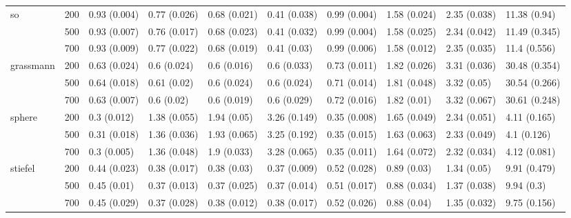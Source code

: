 \begin{tabular}{llllllllll}
\cline{1-10}
\multirow[t]{3}{*}{so} & 200 & 0.93 (0.004) & 0.77 (0.026) & 0.68 (0.021) & 0.41 (0.038) & 0.99 (0.004) & 1.58 (0.024) & 2.35 (0.038) & 11.38 (0.94) \\
 & 500 & 0.93 (0.007) & 0.76 (0.017) & 0.68 (0.023) & 0.41 (0.032) & 0.99 (0.004) & 1.58 (0.025) & 2.34 (0.042) & 11.49 (0.345) \\
 & 700 & 0.93 (0.009) & 0.77 (0.022) & 0.68 (0.019) & 0.41 (0.03) & 0.99 (0.006) & 1.58 (0.012) & 2.35 (0.035) & 11.4 (0.556) \\
\cline{1-10}
\multirow[t]{3}{*}{grassmann} & 200 & 0.63 (0.024) & 0.6 (0.024) & 0.6 (0.016) & 0.6 (0.033) & 0.73 (0.011) & 1.82 (0.026) & 3.31 (0.036) & 30.48 (0.354) \\
 & 500 & 0.64 (0.018) & 0.61 (0.02) & 0.6 (0.024) & 0.6 (0.024) & 0.71 (0.014) & 1.81 (0.048) & 3.32 (0.05) & 30.54 (0.266) \\
 & 700 & 0.63 (0.007) & 0.6 (0.02) & 0.6 (0.019) & 0.6 (0.029) & 0.72 (0.016) & 1.82 (0.01) & 3.32 (0.067) & 30.61 (0.248) \\
\cline{1-10}
\multirow[t]{3}{*}{sphere} & 200 & 0.3 (0.012) & 1.38 (0.055) & 1.94 (0.05) & 3.26 (0.149) & 0.35 (0.008) & 1.65 (0.049) & 2.34 (0.051) & 4.11 (0.165) \\
 & 500 & 0.31 (0.018) & 1.36 (0.036) & 1.93 (0.065) & 3.25 (0.192) & 0.35 (0.015) & 1.63 (0.063) & 2.33 (0.049) & 4.1 (0.126) \\
 & 700 & 0.3 (0.005) & 1.36 (0.048) & 1.9 (0.033) & 3.28 (0.065) & 0.35 (0.011) & 1.64 (0.072) & 2.32 (0.034) & 4.12 (0.081) \\
\cline{1-10}
\multirow[t]{3}{*}{stiefel} & 200 & 0.44 (0.023) & 0.38 (0.017) & 0.38 (0.03) & 0.37 (0.009) & 0.52 (0.028) & 0.89 (0.03) & 1.34 (0.05) & 9.91 (0.479) \\
 & 500 & 0.45 (0.01) & 0.37 (0.013) & 0.37 (0.025) & 0.37 (0.014) & 0.51 (0.017) & 0.88 (0.034) & 1.37 (0.038) & 9.94 (0.3) \\
 & 700 & 0.45 (0.029) & 0.37 (0.028) & 0.38 (0.012) & 0.38 (0.017) & 0.52 (0.026) & 0.88 (0.04) & 1.35 (0.032) & 9.75 (0.156) \\
\cline{1-10}
\bottomrule
\end{tabular}
